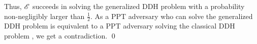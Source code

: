 Thus, $\mathscr{E}$ succeeds in solving the generalized DDH problem with a probability non-negligibly larger than $\frac{1}{2}$. As a \textsf{PPT} adversary who can solve the generalized DDH problem is equivalent to a \textsf{PPT} adversary solving the classical DDH problem \cite{Bao2003}, we get a contradiction. \hfill{\small \qed}



